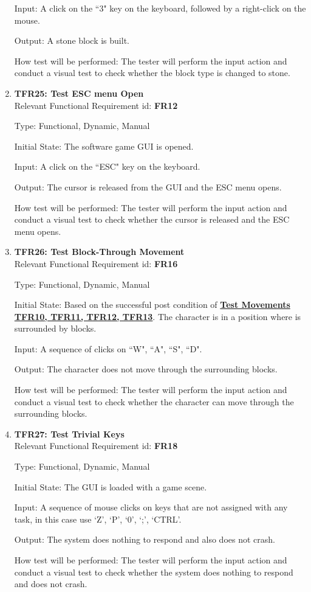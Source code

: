 \documentclass[12pt, titlepage]{article}
\begin{document}
\begin{enumerate}
Input: A click on the ``3" key on the keyboard, followed by a right-click on the mouse.

Output: A stone block is built.

How test will be performed: The tester will perform the input action and conduct a visual test to check whether the block type is changed to stone.

\item{\textbf{TFR25: Test ESC menu Open}\\}
\label{cursor release}
Relevant Functional Requirement id: \textbf{FR12}

Type: Functional, Dynamic, Manual

Initial State: The software game GUI is opened.

Input: A click on the ``ESC" key on the keyboard.

Output: The cursor is released from the GUI and the ESC menu opens.

How test will be performed: The tester will perform the input action and conduct a visual test to check whether the cursor is released and the ESC menu opens.

\item{\textbf{TFR26: Test Block-Through Movement}\\}
Relevant Functional Requirement id: \textbf{FR16}

Type: Functional, Dynamic, Manual

Initial State: Based on the successful post condition of \hyperref[move]{\textbf{Test Movements TFR10, TFR11, TFR12, TFR13}}. The character is in a position where is surrounded by blocks.

Input: A sequence of clicks on ``W", ``A", ``S", ``D".

Output: The character does not move through the surrounding blocks.

How test will be performed: The tester will perform the input action and conduct a visual test to check whether the character can move through the surrounding blocks.

\item{\textbf{TFR27: Test Trivial Keys}\\}
Relevant Functional Requirement id: \textbf{FR18}

Type: Functional, Dynamic, Manual

Initial State: The GUI is loaded with a game scene.

Input: A sequence of mouse clicks on keys that are not assigned with any task, in this case use `Z', `P', `0', `;', `CTRL'.

Output: The system does nothing to respond and also does not crash.

How test will be performed: The tester will perform the input action and conduct a visual test to check whether the system does nothing to respond and does not crash.


\end{enumerate}
\end{document}
